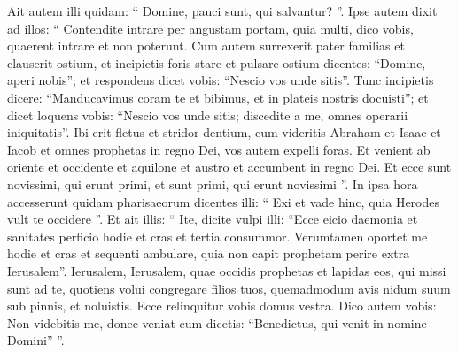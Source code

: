 \begin{biblechapter}
\begin{biblechapter}
\begin{biblechapter}
\begin{biblechapter}
\begin{biblechapter}
\begin{biblechapter}
\begin{biblechapter}
\begin{biblechapter}
\begin{biblechapter}
\begin{biblechapter}
\begin{biblechapter}
\begin{biblechapter}
\begin{biblechapter}
 \verse Ait autem illi quidam: “ Domine, pauci sunt, qui salvantur? ”. Ipse autem dixit ad illos: 
\verse “ Contendite intrare per angustam portam, quia multi, dico vobis, quaerent intrare et non poterunt. 
\verse Cum autem surrexerit pater familias et clauserit ostium, et incipietis foris stare et pulsare ostium dicentes: “Domine, aperi nobis”; et respondens dicet vobis: “Nescio vos unde sitis”. 
\verse Tunc incipietis dicere: “Manducavimus coram te et bibimus, et in plateis nostris docuisti”; 
\verse et dicet loquens vobis: “Nescio vos unde sitis; discedite a me, omnes operarii iniquitatis”. 
\verse Ibi erit fletus et stridor dentium, cum videritis Abraham et Isaac et Iacob et omnes prophetas in regno Dei, vos autem expelli foras. 
\verse Et venient ab oriente et occidente et aquilone et austro et accumbent in regno Dei. 
\verse Et ecce sunt novissimi, qui erunt primi, et sunt primi, qui erunt novissimi ”.
 \verse In ipsa hora accesserunt quidam pharisaeorum dicentes illi: “ Exi et vade hinc, quia Herodes vult te occidere ”. 
\verse Et ait illis: “ Ite, dicite vulpi illi: “Ecce eicio daemonia et sanitates perficio hodie et cras et tertia consummor. 
\verse Verumtamen oportet me hodie et cras et sequenti ambulare, quia non capit prophetam perire extra Ierusalem”.
 \verse Ierusalem, Ierusalem, quae occidis prophetas et lapidas eos, qui missi sunt ad te, quotiens volui congregare filios tuos, quemadmodum avis nidum suum sub pinnis, et noluistis. 
\verse Ecce relinquitur vobis domus vestra. Dico autem vobis: Non videbitis me, donec veniat cum dicetis: “Benedictus, qui venit in nomine Domini” ”.
 

\end{biblechapter}
\end{biblechapter}
\end{biblechapter}
\end{biblechapter}
\end{biblechapter}
\end{biblechapter}
\end{biblechapter}
\end{biblechapter}
\end{biblechapter}
\end{biblechapter}
\end{biblechapter}
\end{biblechapter}
\end{biblechapter}
